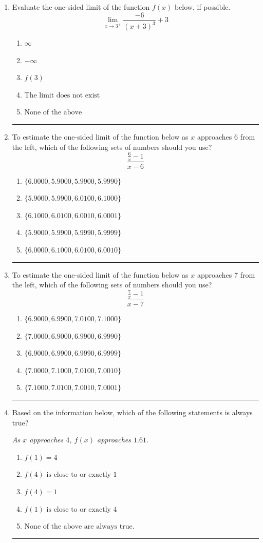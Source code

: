 \documentclass[14pt]{extbook}
\newcommand{\litem}[1]{\item#1\hspace*{-1cm}\rule{\textwidth}{0.4pt}}
\begin{document}
\begin{enumerate}
{\begin{enumerate}[label=\Alph*.]
\end{enumerate} }
\litem{
Evaluate the one-sided limit of the function $f(x)$ below, if possible.\[ \lim_{x \rightarrow 3^+} \frac{-6}{(x+3)^3}+3 \]\begin{enumerate}[label=\Alph*.]
\item \( \infty \)
\item \( -\infty \)
\item \( f(3) \)
\item \( \text{The limit does not exist} \)
\item \( \text{None of the above} \)

\end{enumerate} }
\litem{
To estimate the one-sided limit of the function below as $x$ approaches 6 from the left, which of the following sets of numbers should you use?\[ \frac{\frac{6}{x} - 1}{x - 6} \]\begin{enumerate}[label=\Alph*.]
\item \( \{ 6.0000, 5.9000, 5.9900, 5.9990 \} \)
\item \( \{ 5.9000, 5.9900, 6.0100, 6.1000 \} \)
\item \( \{ 6.1000, 6.0100, 6.0010, 6.0001 \} \)
\item \( \{ 5.9000, 5.9900, 5.9990, 5.9999 \} \)
\item \( \{ 6.0000, 6.1000, 6.0100, 6.0010 \} \)

\end{enumerate} }
\litem{
To estimate the one-sided limit of the function below as $x$ approaches 7 from the left, which of the following sets of numbers should you use?\[ \frac{\frac{7}{x} - 1}{x - 7} \]\begin{enumerate}[label=\Alph*.]
\item \( \{ 6.9000, 6.9900, 7.0100, 7.1000 \} \)
\item \( \{ 7.0000, 6.9000, 6.9900, 6.9990 \} \)
\item \( \{ 6.9000, 6.9900, 6.9990, 6.9999 \} \)
\item \( \{ 7.0000, 7.1000, 7.0100, 7.0010 \} \)
\item \( \{ 7.1000, 7.0100, 7.0010, 7.0001 \} \)

\end{enumerate} }
\litem{
Based on the information below, which of the following statements is always true?
\begin{center}
    \textit{ As $x$ approaches $4$, $f(x)$ approaches $1.61$. }
\end{center}
\begin{enumerate}[label=\Alph*.]
\item \( f(1) = 4 \)
\item \( f(4) \text{ is close to or exactly } 1 \)
\item \( f(4) = 1 \)
\item \( f(1) \text{ is close to or exactly } 4 \)
\item \( \text{None of the above are always true.} \)


\end{enumerate}}
\end{enumerate}
\end{document}
